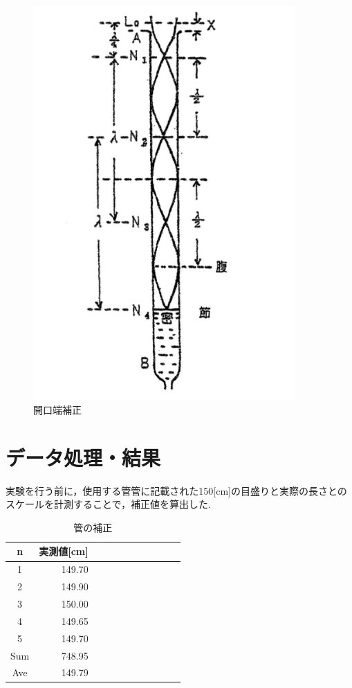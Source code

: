 \documentclass[a4paper,1pt]{jsarticle}
\begin{document}
\begin{figure}[h]
  \begin{center}
  \includegraphics[width=100mm]{act3.png}
  \caption{開口端補正}
  \end{center}
\end{figure}

\clearpage

\section{データ処理・結果}

実験を行う前に，使用する管管に記載された150[cm]の目盛りと実際の長さとのスケールを計測することで，補正値を算出した.

\begin{table}[H]
  \caption{管の補正}
  \label{table:SpeedOfLight}
  \centering
  \begin{tabular}{|c||r|r|r|r|r|r|r|r|r|r|}
    \hline
    n & 実測値[cm] \\
    \hline\hline
    
    1 & 149.70 \\
    2 & 149.90 \\
    3 & 150.00 \\
    4 & 149.65 \\
    5 & 149.70 \\  

    \hline\hline
    Sum & 748.95 \\
    \hline
    Ave & 149.79 \\

    \hline
  \end{tabular}


\end{table}
\end{document}
